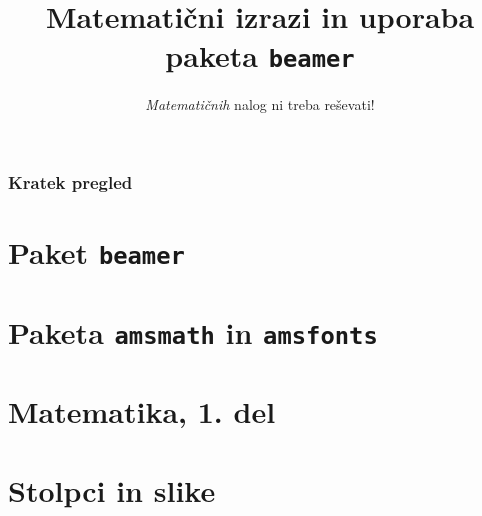 \documentclass{beamer}
\begin{document}

\title{Matematični izrazi in uporaba paketa \texttt{beamer}}
\subtitle{\emph{Matematičnih} nalog ni treba reševati!}
\date{}
\frame{\titlepage}

\begin{frame}
    \frametitle{Kratek pregled}
    \tableofcontents %
    \end{frame}


\section{Paket \texttt{beamer}}

    
\section{Paketa \texttt{amsmath} in \texttt{amsfonts}}

    
    
\section[Matematika, 1. del\\\large{Analiza, logika, množice}]{Matematika, 1. del}


    
\section{Stolpci in slike}

    
\end{document}
